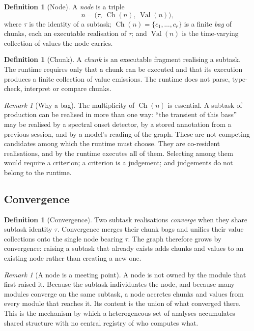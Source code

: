 \documentclass[11pt,twocolumn,a4paper]{article}
\theoremstyle{definition}
\newtheorem{definition}[theorem]{Definition}
\theoremstyle{remark}
\newtheorem{remark}[theorem]{Remark}
\newcommand{\Chunks}{\operatorname{Ch}}
\newcommand{\Vals}{\operatorname{Val}}
\newcommand{\node}{n}
\begin{document}
\begin{definition}[Node]
\label{def:node}
A \emph{node} is a triple
\[
\node=\bigl(\tau,\ \Chunks(\node),\ \Vals(\node)\bigr),
\]
where $\tau$ is the identity of a subtask; $\Chunks(\node)=\{c_1,\dots,c_r\}$ is
a finite \emph{bag} of chunks, each an executable realisation of $\tau$; and
$\Vals(\node)$ is the time-varying collection of values the node carries.
\end{definition}

\begin{definition}[Chunk]
\label{def:chunk}
A \emph{chunk} is an executable fragment realising a subtask. The runtime
requires only that a chunk can be executed and that its execution produces a
finite collection of value emissions. The runtime does not parse, type-check,
interpret or compare chunks.
\end{definition}

\begin{remark}[Why a bag]
\label{rem:bag}
The multiplicity of $\Chunks(\node)$ is essential. A subtask of production can be
realised in more than one way: ``the transient of this bass'' may be realised by
a spectral onset detector, by a stored annotation from a previous session, and by
a model's reading of the graph. These are not competing candidates among which
the runtime must choose. They are co-resident realisations, and by
 the runtime executes all of them. Selecting among them would
require a criterion; a criterion is a judgement; and judgements do not belong to
the runtime.
\end{remark}

\subsection{Convergence}

\begin{definition}[Convergence]
\label{def:convergence}
Two subtask realisations \emph{converge} when they share subtask identity $\tau$.
Convergence merges their chunk bags and unifies their value collections onto the
single node bearing $\tau$. The graph therefore grows by convergence: raising a
subtask that already exists adds chunks and values to an existing node rather
than creating a new one.
\end{definition}

\begin{remark}[A node is a meeting point]
\label{rem:meeting}
A node is not owned by the module that first raised it. Because the subtask
individuates the node, and because many modules converge on the same subtask, a
node accretes chunks and values from every module that reaches it. Its content is
the union of what converged there. This is the mechanism by which a heterogeneous
set of analyses accumulates shared structure with no central registry of who
computes what.
\end{remark}
\end{document}
